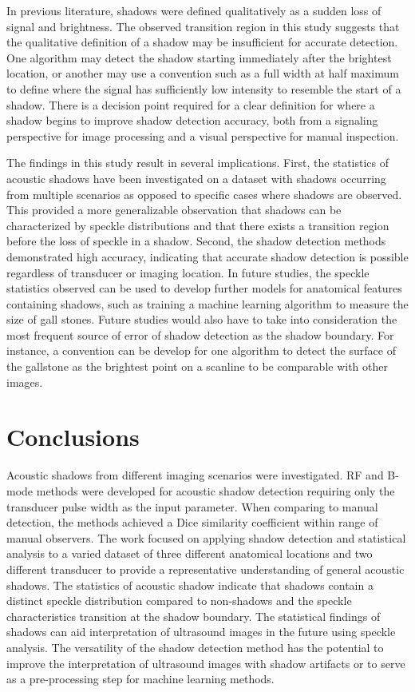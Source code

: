 \documentclass[preprint,5p,authoryear]{elsarticle}
\begin{document}
In previous literature, shadows were defined qualitatively \citep{Kremkau1986} as a sudden loss of signal and brightness. The observed transition region in this study suggests that the qualitative definition of a shadow may be insufficient for accurate detection. One algorithm may detect the shadow starting immediately after the brightest location, or another may use a convention such as a full width at half maximum to define where the signal has sufficiently low intensity to resemble the start of a shadow. There is a decision point required for a clear definition for where a shadow begins to improve shadow detection accuracy, both from a signaling perspective for image processing and a visual perspective for manual inspection. 


The findings in this study result in several implications. First, the statistics of acoustic shadows have been investigated on a dataset with shadows occurring from multiple scenarios as opposed to specific cases where shadows are observed. This provided a more generalizable observation that shadows can be characterized by speckle distributions and that there exists a transition region before the loss of speckle in a shadow. Second, the shadow detection methods demonstrated high accuracy, indicating that accurate shadow detection is possible regardless of transducer or imaging location. In future studies, the speckle statistics observed can be used to develop further models for anatomical features containing shadows, such as training a machine learning algorithm to measure the size of gall stones. Future studies would also have to take into consideration the most frequent source of error of shadow detection as the shadow boundary. For instance, a convention can be develop for one algorithm to detect the surface of the gallstone as the brightest point on a scanline to be comparable with other images.

\section*{Conclusions}
\label{Conclusions}
Acoustic shadows from different imaging scenarios were investigated. RF and B-mode methods were developed for acoustic shadow detection requiring only the transducer pulse width as the input parameter. When comparing to manual detection, the methods achieved a Dice similarity coefficient within range of manual observers. The work focused on applying shadow detection and statistical analysis to a varied dataset of three different anatomical locations and two different transducer to provide a representative understanding of general acoustic shadows. The statistics of acoustic shadow indicate that shadows contain a distinct speckle distribution compared to non-shadows and the speckle characteristics transition at the shadow boundary. The statistical findings of shadows can aid interpretation of ultrasound images in the future using speckle analysis. The versatility of the shadow detection method has the potential to improve the interpretation of ultrasound images with shadow artifacts or to serve as a pre-processing step for machine learning methods.
\end{document}
